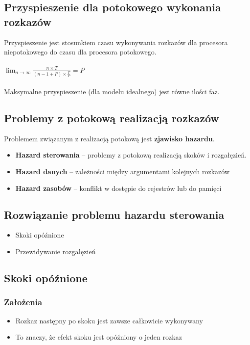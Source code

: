   	\subsection{Przyspieszenie dla potokowego wykonania rozkazów}
	   	Przyspieszenie jest stosunkiem czasu wykonywania rozkazów dla procesora niepotokowego do czasu dla procesora potokowego.\\\\
	   	$\lim_{n \to \infty}\frac{n\times T}{(n-1+P)\times\frac{T}{P}}=P$\\\\
	   	Maksymalne przyspieszenie (dla modelu idealnego) jest równe ilości faz.
   	\subsection{Problemy z potokową realizacją rozkazów}
   		Problemem związanym z realizacją potokową jest \textbf{zjawisko hazardu}.
	   	\begin{itemize}
	   		\item \textbf{Hazard sterowania }– problemy z potokową realizacją skoków i rozgałęzień.
	   		\item \textbf{Hazard danych} – zależności między argumentami kolejnych rozkazów
	   		\item \textbf{Hazard zasobów} – konflikt w dostępie do rejestrów lub do pamięci
	   	\end{itemize}
   	\subsection{Rozwiązanie problemu hazardu sterowania}
	   	\begin{itemize}
	   		\item Skoki opóźnione
	   		\item Przewidywanie rozgałęzień
	   	\end{itemize}
   	\subsection{Skoki opóźnione}
	   	\subsubsection{Założenia}
		   	\begin{itemize}
		   		\item Rozkaz następny po skoku jest zawsze całkowicie wykonywany
		   		\item To znaczy, że efekt skoku jest opóźniony o jeden rozkaz
		   	\end{itemize}
